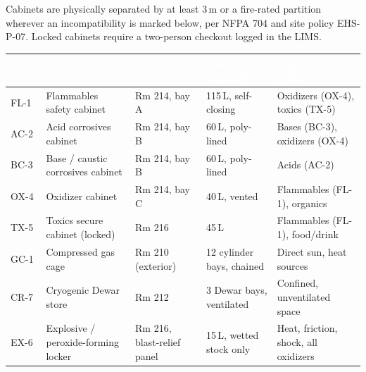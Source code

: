 

\noindent\small Cabinets are physically separated by at least 3\,m or a fire-rated partition
wherever an incompatibility is marked below, per NFPA 704 \cite{nfpa704} and site policy
EHS-P-07. Locked cabinets require a two-person checkout logged in the LIMS.

\vspace{6pt}
\begin{tabular}{@{}L{1.4cm}L{4.6cm}L{2.3cm}L{2.6cm}L{6.6cm}@{}}
\toprule
{}
\textcolor{white}{\bfseries Code} & \textcolor{white}{\bfseries Cabinet / Store} &
\textcolor{white}{\bfseries Location} & \textcolor{white}{\bfseries Rated Capacity} &
\textcolor{white}{\bfseries Segregated From} \\
\midrule
FL-1 & Flammables safety cabinet & Rm 214, bay A & 115\,L, self-closing & Oxidizers (OX-4), toxics (TX-5) \\
 AC-2 & Acid corrosives cabinet & Rm 214, bay B & 60\,L, poly-lined & Bases (BC-3), oxidizers (OX-4) \\
BC-3 & Base / caustic corrosives cabinet & Rm 214, bay B & 60\,L, poly-lined & Acids (AC-2) \\
 OX-4 & Oxidizer cabinet & Rm 214, bay C & 40\,L, vented & Flammables (FL-1), organics \\
TX-5 & Toxics secure cabinet (locked) & Rm 216 & 45\,L & Flammables (FL-1), food/drink \\
 GC-1 & Compressed gas cage & Rm 210 (exterior) & 12 cylinder bays, chained & Direct sun, heat sources \\
CR-7 & Cryogenic Dewar store & Rm 212 & 3 Dewar bays, ventilated & Confined, unventilated space \\
 EX-6 & Explosive / peroxide-forming locker & Rm 216, blast-relief panel & 15\,L, wetted stock only & Heat, friction, shock, all oxidizers \\
\bottomrule
\end{tabular}

\vspace{10pt}
\noindent{}
